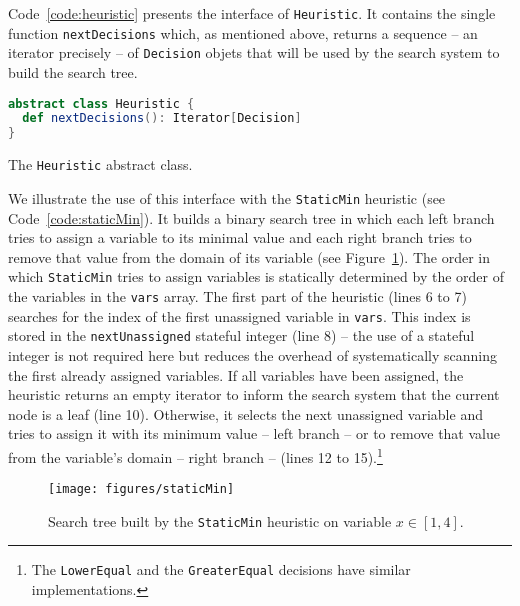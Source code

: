 \documentclass{llncs}
\newcommand{\fig}[1]{Figure~\ref{fig:#1}}
\begin{document}
\noindent
Code~\ref{code:heuristic} presents the interface of \texttt{Heuristic}. 
It contains the single function \texttt{nextDecisions} which, as mentioned above, returns a sequence -- an iterator precisely -- of \texttt{Decision} objets that will be used by the search system to build the search tree.
%
\begin{code}
\begin{lstlisting}[language=scala, style=lineNumber]
abstract class Heuristic {
  def nextDecisions(): Iterator[Decision]
}
\end{lstlisting}
\caption{The \texttt{Heuristic} abstract class.}
\label{code:heuristic}
\end{code}

\noindent
We illustrate the use of this interface with the \texttt{StaticMin} heuristic (see Code~\ref{code:staticMin}). 
It builds a binary search tree in which each left branch tries to assign a variable to its minimal value and each right branch tries to remove that value from the domain of its variable (see \fig{staticMin}). 
The order in which \texttt{StaticMin} tries to assign variables is statically determined by the order of the variables in the \texttt{vars} array. 
The first part of the heuristic (lines 6 to 7) searches for the index of the first unassigned variable in \texttt{vars}. 
This index is stored in the \texttt{nextUnassigned} stateful integer (line 8) -- the use of a stateful integer is not required here but reduces the overhead of systematically scanning the first already assigned variables. 
If all variables have been assigned, the heuristic returns an empty iterator to inform the search system that the current node is a leaf (line 10).
Otherwise, it selects the next unassigned variable and tries to assign it with its minimum value -- left branch -- or to remove that value from the variable's domain  -- right branch -- (lines 12 to 15).\footnote{The \texttt{LowerEqual} and the \texttt{GreaterEqual} decisions have similar implementations.}

\begin{figure}
    \centering
    \texttt{[image: figures/staticMin]}
    \caption{Search tree built by the \texttt{StaticMin} heuristic on variable $x \in [1, 4]$.}
    \label{fig:staticMin}
\end{figure}
\end{document}
